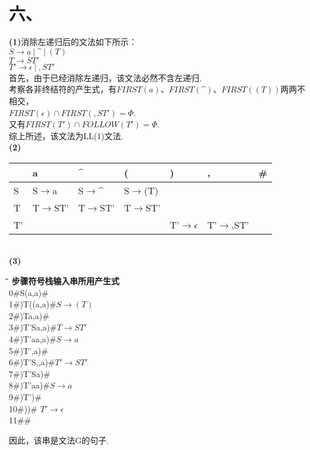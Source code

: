 \documentclass{article}
\begin{document}
\section*{六、}
\noindent
\textbf{(1)}消除左递归后的文法如下所示：\\
$S\rightarrow a\ |\ \^{}\ |\ (T)$\\
$T\rightarrow ST'$\\
$T'\rightarrow \epsilon\ |\ ,ST'$\\
首先，由于已经消除左递归，该文法必然不含左递归.\\
考察各非终结符的产生式，有$FIRST(a)$、$FIRST(\^{})$、$FIRST((T))$两两不相交，\\
$FIRST(\epsilon)\cap FIRST(,ST')=\Phi$.\\
又有$FIRST(T')\cap FOLLOW(T')=\Phi$.\\
综上所述，该文法为LL(1)文法.\\
\textbf{(2)}
\begin{table}[h]
    \centering
\begin{tabular}{|p{2cm}<{\centering}|p{2cm}<{\centering}|p{2cm}<{\centering}|p{2cm}<{\centering}|p{2cm}<{\centering}|p{2cm}<{\centering}|p{2cm}<{\centering}|}   
    \hline
    \ & a & $\^{}$ & ( & ) & , & \# \\
    \hline
    S & S$\rightarrow$a & S$\rightarrow\^{}$ & S$\rightarrow$(T) & \ & \ & \ \\
    \hline
    T & T$\rightarrow$ST' & T$\rightarrow$ST' & T$\rightarrow$ST' & & & \\
    \hline
    T' & & & & T'$\rightarrow\epsilon$& T'$\rightarrow$,ST' & \\
    \hline
\end{tabular}
\end{table}
\\
\textbf{(3)}
\begin{tabbing}
    \hspace{1.5cm} \= \hspace{3cm}\= \hspace{3cm}\= \hspace{3cm}\= \kill
    \textbf{步骤}\>\textbf{符号栈}\>\textbf{输入串}\>\textbf{所用产生式}\\
    0\>\#S\>(a,a)\#\\
    1\>\#)T(\>(a,a)\#\>$S\rightarrow(T)$\\
    2\>\#)T\>a,a)\#\\
    3\>\#)T'S\>a,a)\#\>$T\rightarrow ST'$\\
    4\>\#)T'a\>a,a)\#\>$S\rightarrow a$\\
    5\>\#)T'\>,a)\#\\
    6\>\#)T'S,\>,a)\#\>$T'\rightarrow ST'$\\
    7\>\#)T'S\>a)\#\\
    8\>\#)T'a\>a)\#\>$S\rightarrow a$\\
    9\>\#)T'\>)\#\\
    10\>\#)\>)\#\> $T'\rightarrow\epsilon$\\
    11\>\#\>\#
\end{tabbing}
因此，该串是文法G的句子.
\end{document}
